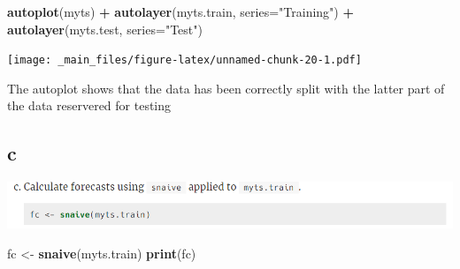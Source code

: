\documentclass[]{book}
\newenvironment{Shaded}{\begin{snugshade}}{\end{snugshade}}
\newcommand{\DataTypeTok}[1]{\textcolor[rgb]{0.13,0.29,0.53}{#1}}
\newcommand{\KeywordTok}[1]{\textcolor[rgb]{0.13,0.29,0.53}{\textbf{#1}}}
\newcommand{\NormalTok}[1]{#1}
\newcommand{\OperatorTok}[1]{\textcolor[rgb]{0.81,0.36,0.00}{\textbf{#1}}}
\newcommand{\StringTok}[1]{\textcolor[rgb]{0.31,0.60,0.02}{#1}}
\begin{document}
\begin{Shaded}
\begin{Highlighting}[]
\KeywordTok{autoplot}\NormalTok{(myts) }\OperatorTok{+}
\StringTok{  }\KeywordTok{autolayer}\NormalTok{(myts.train, }\DataTypeTok{series=}\StringTok{"Training"}\NormalTok{) }\OperatorTok{+}
\StringTok{  }\KeywordTok{autolayer}\NormalTok{(myts.test, }\DataTypeTok{series=}\StringTok{"Test"}\NormalTok{)}
\end{Highlighting}
\end{Shaded}

\texttt{[image: \_main\_files/figure-latex/unnamed-chunk-20-1.pdf]}

The autoplot shows that the data has been correctly split with the latter part of the data reservered for testing

\hypertarget{c-1}{%
\subsection{c}\label{c-1}}

\includegraphics{./week1/3.8c.png}

\begin{Shaded}
\begin{Highlighting}[]
\NormalTok{fc <-}\StringTok{ }\KeywordTok{snaive}\NormalTok{(myts.train)}
\KeywordTok{print}\NormalTok{(fc)}
\end{Highlighting}
\end{Shaded}
\end{document}
